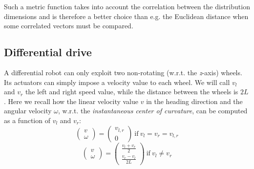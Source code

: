 		Such a metric function takes into account the correlation between the distribution dimensions and is therefore a better choice than e.g. the Euclidean distance when some correlated vectors must be compared.
	
	\subsection{Differential drive}
		\label{app.differential_drive}
		
		A differential robot can only exploit two non-rotating (w.r.t. the \emph{z}-axis) wheels. 
		Its actuators can simply impose a velocity value to each wheel. 
		We will call $v_l$ and $v_r$ the left and right speed value, while the distance between the wheels is $2L$.
		Here we recall how the linear velocity value $v$ in the heading direction and the angular velocity $\omega$, w.r.t. the \emph{instantaneous center of curvature}, can be computed as a function of $v_l$ and $v_r$:
		\begin{equation}
			\left(\begin{array}{c}
				v \\ \omega
			\end{array}\right)
			=
			\left(\begin{array}{c}
				v_{l,r} \\ 0
			\end{array}\right)
			\ \mathrm{if} \ v_l = v_r = v_{l,r}
		\end{equation}
		\begin{equation}
			\left(\begin{array}{c}
				v \\ \omega
			\end{array}\right)
			=
			\left(\begin{array}{c}
				\frac{v_l + v_r}{2} \\ 
				\frac{v_r - v_l}{2L}
			\end{array}\right)
			\ \mathrm{if} \ v_l \neq v_r
		\end{equation}